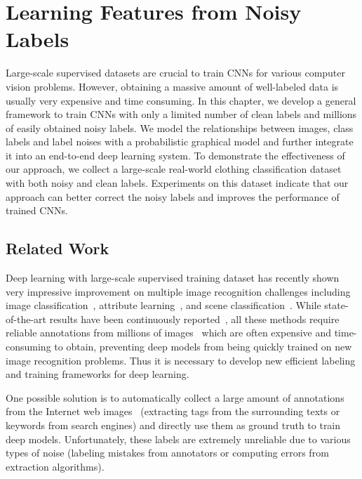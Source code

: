 \chapter{Learning Features from Noisy Labels}
\label{ch:noisy-labels}

Large-scale supervised datasets are crucial to train CNNs for various computer vision problems. However, obtaining a massive amount of well-labeled data is usually very expensive and time consuming. In this chapter, we develop a general framework to train CNNs with only a limited number of clean labels and millions of easily obtained noisy labels. We model the relationships between images, class labels and label noises with a probabilistic graphical model and further integrate it into an end-to-end deep learning system. To demonstrate the effectiveness of our approach, we collect a large-scale real-world clothing classification dataset with both noisy and clean labels. Experiments on this dataset indicate that our approach can better correct the noisy labels and improves the performance of trained CNNs.

\section{Related Work} %
\label{sec:nl-related-work}
Deep learning with large-scale supervised training dataset has recently shown very impressive improvement on multiple image recognition challenges including image classification~\cite{krizhevsky2012imagenet}, attribute learning~\cite{zhang2014panda}, and scene classification~\cite{farabet2013learning}. While state-of-the-art results have been continuously reported~\cite{zeiler2013visualizing,simonyan2014very,szegedy2014going}, all these methods require reliable annotations from millions of images~\cite{deng2009imagenet} which are often expensive and time-consuming to obtain, preventing deep models from being quickly trained on new image recognition problems. Thus it is necessary to develop new efficient labeling and training frameworks for deep learning.

One possible solution is to automatically collect a large amount of annotations from the Internet web images~\cite{gong2014multiview} (\ie extracting tags from the surrounding texts or keywords from search engines) and directly use them as ground truth to train deep models. Unfortunately, these labels are extremely unreliable due to various types of noise (\eg labeling mistakes from annotators or computing errors from extraction algorithms).

